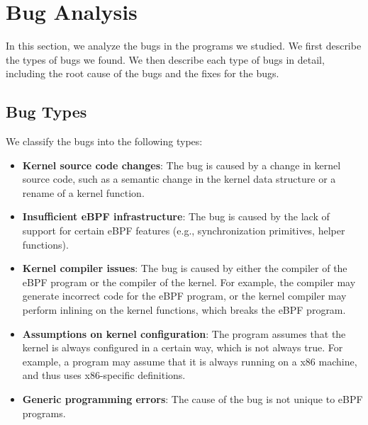 \section{Bug Analysis}
In this section, we analyze the bugs in the programs we studied. 
We first describe the types of bugs we found. 
We then describe each type of bugs in detail, including the root cause of the bugs and the fixes for the bugs.

\subsection{Bug Types}
We classify the bugs into the following types:
\begin{itemize}
    \item \textbf{Kernel source code changes}: The bug is caused by a change in kernel source code, such as a semantic change in the kernel data structure or a rename of a kernel function.
    \item \textbf{Insufficient eBPF infrastructure}: The bug is caused by the lack of support for certain eBPF features (e.g., synchronization primitives, helper functions).
    \item \textbf{Kernel compiler issues}: The bug is caused by either the compiler of the eBPF program or the compiler of the kernel. For example, the compiler may generate incorrect code for the eBPF program, or the kernel compiler may perform inlining on the kernel functions, which breaks the eBPF program.
    \item \textbf{Assumptions on kernel configuration}: The program assumes that the kernel is always configured in a certain way, which is not always true. For example, a program may assume that it is always running on a x86 machine, and thus uses x86-specific definitions.
    \item \textbf{Generic programming errors}: The cause of the bug is not unique to eBPF programs.
\end{itemize}

